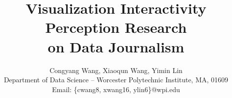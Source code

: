 \documentclass[9pt,journal,compsoc]{IEEEtran}
\begin{document}
\title {\Huge Visualization Interactivity Perception Research \\ on Data Journalism}

\author{Congyang Wang, Xiaoqun Wang, Yimin Lin \\ Department of Data Science -- Worcester Polytechnic Institute, MA, 01609 \\ Email: \{cwang8, xwang16, ylin6\}@wpi.edu}

\end{document}
